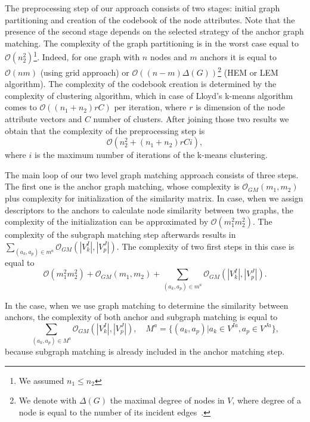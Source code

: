 The preprocessing step of our approach consists of two stages: initial graph partitioning and creation of the codebook of the node attributes. Note that the presence of the second stage depends on the selected strategy of the anchor graph matching. The complexity of the graph partitioning is in the worst case equal to $\mathcal{O}(n_2^2)$\footnote{We assumed $n_1\le n_2$}. Indeed, for one graph with $n$ nodes and $m$ anchors it is equal to $\mathcal{O}(nm)$ (using grid approach) or $\mathcal{O}((n-m)\Delta(G))$\footnote{We denote with $\Delta(G)$ the maximal degree of nodes in $V$, where degree of a node is equal to the number of its incident edges~\cite{Diestel2000}.} (HEM or LEM algorithm). The complexity of the codebook creation is determined by the complexity of clustering algorithm, which in case of Lloyd's k-means algorithm~\cite{kmeans_LLoyd} comes to $\mathcal{O}((n_1+n_2)rC)$ per iteration, where $r$ is dimension of the node attribute vectors and $C$ number of clusters. After joining those two results we obtain that the complexity of the preprocessing step is
\begin{equation}\label{eq:complexity1}
\mathcal{O}(n_2^2+(n_1+n_2)rCi),
\end{equation}where $i$ is the maximum number of iterations of the k-means clustering.

The main loop of our two level graph matching approach consists of three steps. The first one is the anchor graph matching, whose complexity is $\mathcal{O}_{GM}(m_1,m_2)$ plus complexity for initialization of the similarity matrix. In case, when we assign descriptors to the anchors to calculate node similarity between two graphs, the complexity of the initialization can be approximated by $\mathcal{O}(m_1^2m_2^2)$. The complexity of the subgraph matching step afterwards results in $\sum_{(a_k,a_p)\in m^a}\mathcal{O}_{GM}(|V^I_k|,|V^J_p|)$. The complexity of two first steps in this case is equal to
\begin{equation}\label{eq:complexity2}
\mathcal{O}(m_1^2m_2^2)+\mathcal{O}_{GM}(m_1,m_2)+\sum_{(a_k,a_p)\in m^a}\mathcal{O}_{GM}(|V^I_k|,|V^J_p|).
\end{equation}


In the case, when we use graph matching to determine the similarity between anchors, the complexity of both anchor and subgraph matching is equal to 
\begin{equation}
\sum_{(a_k,a_p)\in M^a}\mathcal{O}_{GM}(|V^I_k|,|V^J_p|),\quad M^a=\{(a_k,a_p)|a_k\in V^{Ia},a_p\in V^{Ja}\},
\end{equation}because subgraph matching is already included in the anchor matching step.

